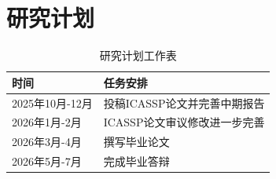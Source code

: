 \chapter{研究计划}

\begin{table}
  \centering
  \caption{研究计划工作表}
  \begin{tabular}{ll}
    \toprule
    时间          & 任务安排                         \\
    \midrule
    2025年10月-12月  & 投稿ICASSP论文并完善中期报告\\
    2026年1月-2月   & ICASSP论文审议修改进一步完善 \\
    2026年3月-4月  & 撰写毕业论文   \\
    2026年5月-7月  & 完成毕业答辩    \\
    \bottomrule
  \end{tabular}
  \label{tab:7}
\end{table}
